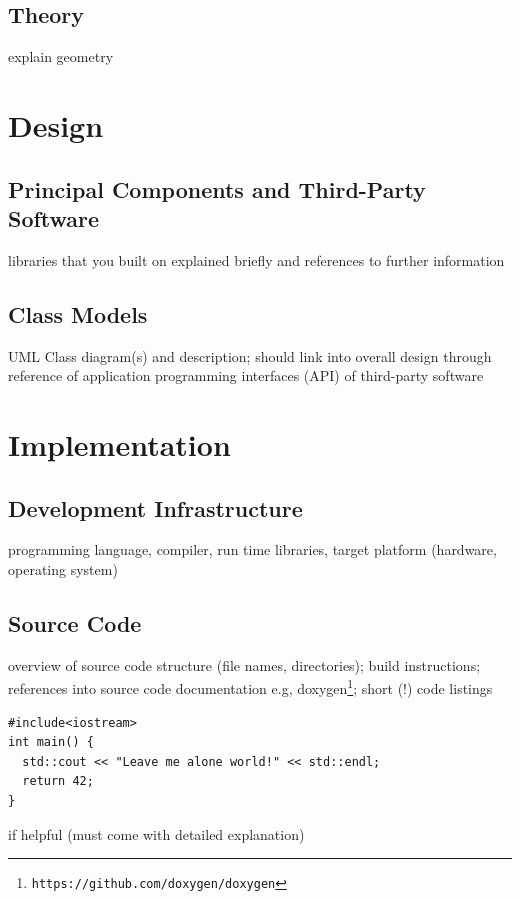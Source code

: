 \documentclass{article}
\begin{document}
\subsection{Theory}

explain geometry

\section{Design} \label{ch:design}

\subsection{Principal Components and Third-Party Software}

libraries that you built on explained briefly and references to further information

\subsection{Class Models}

UML Class diagram(s) and description; should link into overall design through
reference of application programming interfaces (API) of third-party software

\section{Implementation} \label{ch:implementation}

\subsection{Development Infrastructure}

programming language, compiler, run time libraries, target platform
(hardware, operating system)

\subsection{Source Code}

overview of source code structure (file names, directories); build instructions; references into source code documentation e.g, doxygen\footnote{\tt https://github.com/doxygen/doxygen}; short (!) code listings
\begin{lstlisting}
#include<iostream>
int main() {
  std::cout << "Leave me alone world!" << std::endl;
  return 42;
}
\end{lstlisting}
if helpful (must come with detailed explanation)
\end{document}
